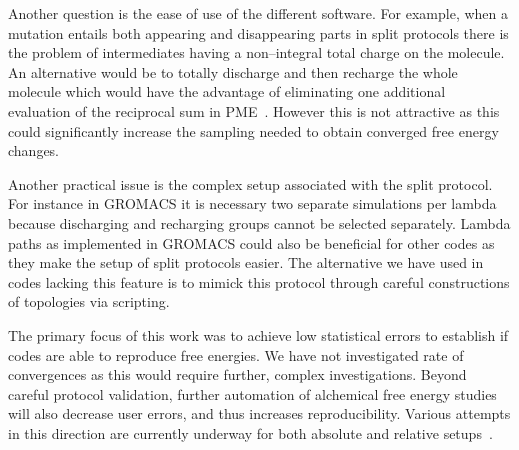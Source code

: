 \documentclass[journal=jctcce,manuscript=article]{achemso}
\begin{document}
Another question is the ease of use of the different software.  For example, when a mutation entails both appearing and disappearing parts in split
protocols there is the problem of intermediates having a non--integral total
charge on the molecule.  An alternative would be to totally discharge and then
recharge the whole molecule which
would have the advantage of eliminating one additional evaluation of the reciprocal sum in PME~\cite{doi:10.1021/ct400340s}.
 However this is not attractive as this could significantly increase the sampling needed to obtain converged free energy changes.

 Another practical issue is the complex setup associated with the split protocol. For instance in GROMACS it is necessary  two separate simulations per lambda because discharging and recharging groups cannot be selected separately.
Lambda paths as implemented in GROMACS could also be beneficial for other codes as they make the setup of split protocols easier.  The alternative we have used in codes lacking this feature is to mimick this protocol through careful constructions of
topologies via scripting.
%

The primary focus of this work was to achieve low statistical errors to establish if codes are able to reproduce free energies.  We have not investigated rate of convergences as this would require further, complex investigations.  Beyond careful protocol validation,  further automation of alchemical free energy studies will also decrease user errors, and thus increases  reproducibility.  Various attempts in
this direction are currently underway for both absolute and relative
setups~\cite{christ_accuracy_2013, JCC:JCC23804, Liu2013,
doi:10.1021/jp505332p, doi:10.1021/acs.jcim.6b00162,
doi:10.1021/acs.jctc.6b00979,loeffler_fesetup:_2015}.
\end{document}
